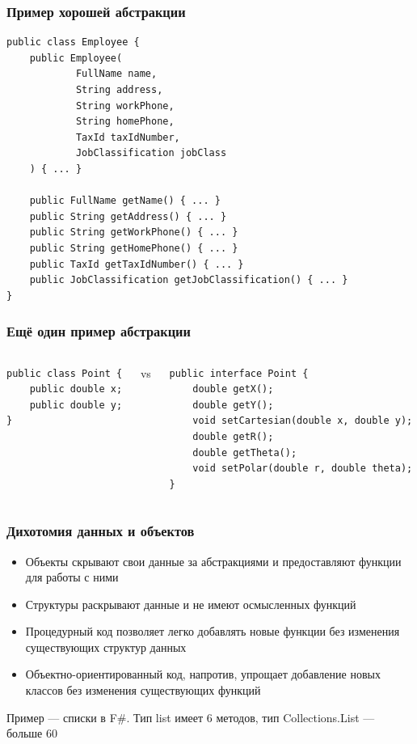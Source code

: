 \documentclass[xetex,mathserif,serif]{beamer}
\begin{document}
	\begin{frame}[fragile]
		\frametitle{Пример хорошей абстракции}
		\begin{footnotesize}
			\begin{verbatim}
public class Employee {
    public Employee(
            FullName name,
            String address,
            String workPhone,
            String homePhone,
            TaxId taxIdNumber,
            JobClassification jobClass
    ) { ... }

    public FullName getName() { ... }
    public String getAddress() { ... }
    public String getWorkPhone() { ... }
    public String getHomePhone() { ... }
    public TaxId getTaxIdNumber() { ... }
    public JobClassification getJobClassification() { ... }
}
			\end{verbatim}
		\end{footnotesize}
	\end{frame}

	\begin{frame}[fragile]
		\frametitle{Ещё один пример абстракции}
		\begin{columns}
			\begin{column}{0.32\textwidth}
				\begin{verbatim}
public class Point {
    public double x;
    public double y;
}
				\end{verbatim}
			\end{column}
			\begin{column}{0.05\textwidth}
				vs
			\end{column}
			\begin{column}{0.6\textwidth}
				\begin{verbatim}
public interface Point {
    double getX();
    double getY();
    void setCartesian(double x, double y);
    double getR();
    double getTheta();
    void setPolar(double r, double theta);
}
				\end{verbatim}
			\end{column}
		\end{columns}
	\end{frame}

	\begin{frame}
		\frametitle{Дихотомия данных и объектов}
		\begin{itemize}
			\item Объекты скрывают свои данные за абстракциями и предоставляют функции для работы с ними
			\item Структуры раскрывают данные и не имеют осмысленных функций
		\end{itemize}
		\vspace{3mm}
		\begin{itemize}
			\item Процедурный код позволяет легко добавлять новые функции без изменения существующих структур данных
			\item Объектно-ориентированный код, напротив, упрощает добавление новых классов без изменения существующих функций
		\end{itemize}
		\vspace{3mm}
		Пример --- списки в F\#. Тип list имеет 6 методов, тип Collections.List --- больше 60
	\end{frame}
\end{document}
